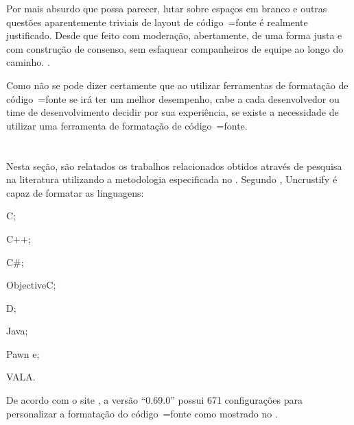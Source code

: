 %
\begin{citacao}
    Por mais absurdo que possa parecer,
    lutar sobre espaços em branco e
    outras questões aparentemente triviais de layout de código~=fonte é realmente justificado.
    Desde que feito com moderação,
    abertamente,
    de uma forma justa e
    com construção de consenso,
    sem esfaquear companheiros de equipe ao longo do caminho.
    \cite[tradução nossa\protect\footnotemark]{deathToTheSpaceInfidels}.
\end{citacao}

Como não se pode dizer certamente que ao utilizar ferramentas de formatação de código~=fonte se irá ter um melhor desempenho,
cabe a cada desenvolvedor ou
time de desenvolvimento decidir por sua experiência,
se existe a necessidade de utilizar uma ferramenta de formatação de código~=fonte.


\section{}
\label{trabalhosRelacionados}

Nesta seção,
são relatados os trabalhos relacionados obtidos através de pesquisa na literatura utilizando a metodologia especificada no .
Segundo ,
Uncrustify é capaz de formatar as linguagens:
\begin{inparaenum}[1)]
\item C;
\item C++;
\item C\#;
\item ObjectiveC;
\item D;
\item Java;
\item Pawn e;
\item VALA.
\end{inparaenum}%
De acordo com o site ,
a versão ``0.69.0'' possui 671 configurações para personalizar a formatação do código~=fonte como mostrado no .

